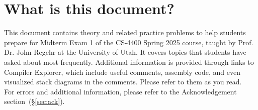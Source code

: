 \section{What is this document?}
%
This document contains theory and related practice problems to 
help students prepare for Midterm Exam 1 of the CS-4400 Spring 2025 
course, taught by Prof. Dr. John Regehr at the University of Utah. 
It covers topics that students have asked about most frequently. Additional 
information is provided through links to Compiler Explorer, which include 
useful comments, assembly code, and even visualized stack diagrams in the 
comments. Please refer to them as you read. \\

%
\noindent For errors and additional information, please refer to the Acknowledgement 
section~(\S\ref{sec:ack}).
\clearpage
%
